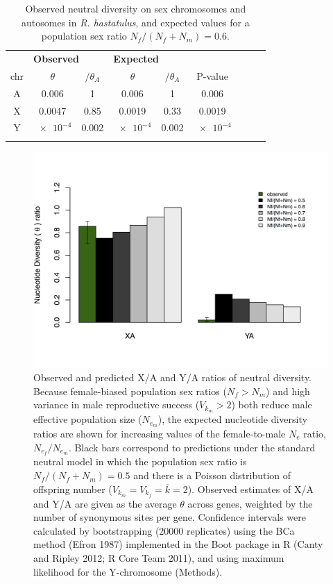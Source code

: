 \documentclass[9pt,twocolumn,twoside]{gsajnl}
\begin{document}
\begin{table}[htb]
\centering
\caption{Observed neutral diversity on sex chromosomes and autosomes in \textit{R. hastatulus}, and expected values for a population sex ratio $N_{f}/(N_{f}+N_{m})=0.6$.}
\begin{tabular}{ccccccccc}
\textbf{} & \multicolumn{2}{l}{\textbf{Observed}} & \multicolumn{3}{l}{\textbf{Expected}} \\

chr & $\theta$ & $/\theta_{A}$ & $\theta$ & $/\theta_{A}$ & P-value  \\
\midrule
A & 0.006 & 1 & 0.006 & 1 & 0.006 \\
X & 0.0047 & 0.85 & 0.0019 & 0.33 & 0.0019 \\
Y & $\num{e-4}$ & 0.002 & $\num{e-4}$ & 0.002 & $\num{e-4}$ \\
\addlinespace

\bottomrule
\end{tabular}
\end{table}

\begin{figure}[htbp]
\centering
\noindent
\includegraphics[width=\linewidth]{figure2.jpg}
\caption{Observed and predicted X/A and Y/A ratios of neutral diversity. Because female-biased population sex ratios ($N_{f} > N_{m}$) and high variance in male reproductive success ($V_{k}_{m} > 2$) both reduce male effective population size ($N_{e}_{m}$), the expected nucleotide diversity ratios are shown for increasing values of the female-to-male $N_{e}$ ratio, $N_{e}_{f}/N_{e}_{m}$. Black bars correspond to predictions under the standard neutral model in which the population sex ratio is $N_{f}/(N_{f}+N_{m})=0.5$ and there is a Poisson distribution of offspring number ($V_{k}_{m} = V_{k}_{f} = \overline{k}=2$). Observed estimates of X/A and Y/A are given as the average $\theta$ across genes, weighted by the number of synonymous sites per gene. Confidence intervals were calculated by bootstrapping (20000 replicates) using the BCa method (Efron 1987) implemented in the Boot package in R (Canty and Ripley 2012; R Core Team 2011), and using maximum likelihood for the Y-chromosome (Methods).
}
\label{fig:spectrum}
\end{figure}
\end{document}

